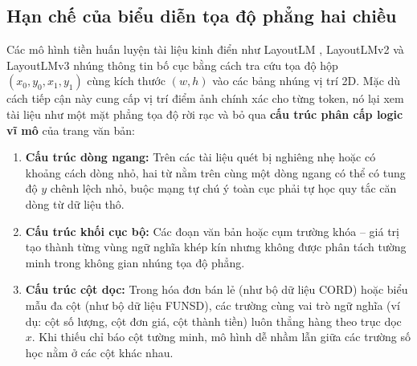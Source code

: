 \subsection{Hạn chế của biểu diễn tọa độ phẳng hai chiều}
Các mô hình tiền huấn luyện tài liệu kinh điển như LayoutLM \cite{xu2020layoutlm}, LayoutLMv2 \cite{xu2021layoutlmv2} và LayoutLMv3 \cite{huang2022layoutlmv3} nhúng thông tin bố cục bằng cách tra cứu tọa độ hộp $(x_0, y_0, x_1, y_1)$ cùng kích thước $(w, h)$ vào các bảng nhúng vị trí 2D. Mặc dù cách tiếp cận này cung cấp vị trí điểm ảnh chính xác cho từng token, nó lại xem tài liệu như một mặt phẳng tọa độ rời rạc và bỏ qua \textbf{cấu trúc phân cấp logic vĩ mô} của trang văn bản:
\begin{enumerate}
    \item \textbf{Cấu trúc dòng ngang:} Trên các tài liệu quét bị nghiêng nhẹ hoặc có khoảng cách dòng nhỏ, hai từ nằm trên cùng một dòng ngang có thể có tung độ $y$ chênh lệch nhỏ, buộc mạng tự chú ý toàn cục phải tự học quy tắc căn dòng từ dữ liệu thô.
    \item \textbf{Cấu trúc khối cục bộ:} Các đoạn văn bản hoặc cụm trường khóa -- giá trị tạo thành từng vùng ngữ nghĩa khép kín nhưng không được phân tách tường minh trong không gian nhúng tọa độ phẳng.
    \item \textbf{Cấu trúc cột dọc:} Trong hóa đơn bán lẻ (như bộ dữ liệu CORD) hoặc biểu mẫu đa cột (như bộ dữ liệu FUNSD), các trường cùng vai trò ngữ nghĩa (ví dụ: cột số lượng, cột đơn giá, cột thành tiền) luôn thẳng hàng theo trục dọc $x$. Khi thiếu chỉ báo cột tường minh, mô hình dễ nhầm lẫn giữa các trường số học nằm ở các cột khác nhau.
\end{enumerate}

